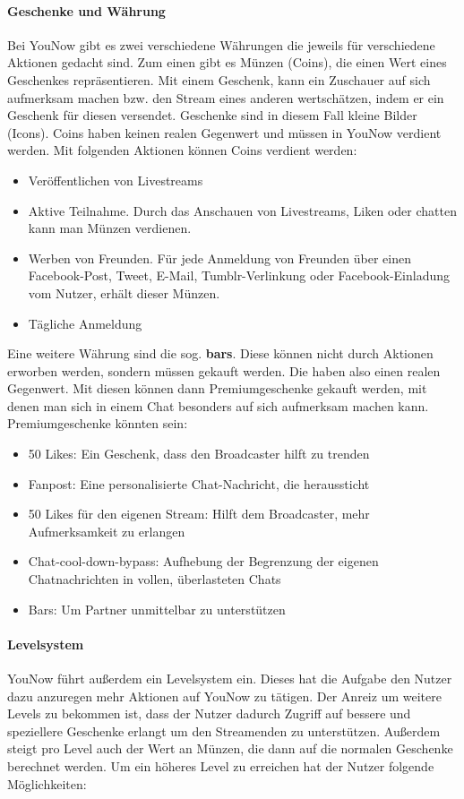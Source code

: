 \paragraph{Geschenke und Währung}
Bei YouNow gibt es zwei verschiedene Währungen die jeweils für verschiedene Aktionen gedacht sind. Zum einen gibt es Münzen (Coins), die einen Wert eines Geschenkes repräsentieren. Mit einem Geschenk, kann ein Zuschauer auf sich aufmerksam machen bzw. den Stream eines anderen wertschätzen, indem er ein Geschenk für diesen versendet. Geschenke sind in diesem Fall kleine Bilder (Icons).
Coins haben keinen realen Gegenwert und müssen in YouNow verdient werden. Mit folgenden Aktionen können Coins verdient werden:

\begin{itemize}
	\item Veröffentlichen von Livestreams
	\item Aktive Teilnahme. Durch das Anschauen von Livestreams, Liken oder chatten kann man Münzen verdienen.
	\item Werben von Freunden. Für jede
		Anmeldung von Freunden über einen Facebook-Post, Tweet, E-Mail,
		Tumblr-Verlinkung oder Facebook-Einladung vom Nutzer, erh\"alt dieser M\"unzen. 
	\item T\"agliche Anmeldung
\end{itemize} 

Eine weitere Währung sind die sog. \textbf{bars}. Diese können nicht durch Aktionen erworben werden, sondern müssen gekauft werden. Die haben also einen realen Gegenwert. Mit diesen können dann Premiumgeschenke gekauft werden, mit denen man sich in einem Chat besonders auf sich aufmerksam machen kann. Premiumgeschenke könnten sein:

\begin{itemize}
	\item 50 Likes: Ein Geschenk, dass den Broadcaster hilft zu trenden
	\item Fanpost: Eine personalisierte Chat-Nachricht, die heraussticht 
	\item 50 Likes für den eigenen Stream: Hilft dem Broadcaster, mehr Aufmerksamkeit zu erlangen
	\item Chat-cool-down-bypass: Aufhebung der Begrenzung der eigenen Chatnachrichten in vollen, überlasteten Chats
	\item Bars: Um Partner unmittelbar zu unterstützen
\end{itemize}

\paragraph{Levelsystem}
YouNow führt außerdem ein Levelsystem ein. Dieses hat die Aufgabe den Nutzer dazu anzuregen mehr Aktionen auf YouNow zu tätigen. Der Anreiz um weitere Levels zu bekommen ist, dass der Nutzer dadurch Zugriff auf bessere und speziellere Geschenke erlangt um den Streamenden zu unterstützen. Außerdem steigt pro Level auch der Wert an Münzen, die dann auf die normalen Geschenke berechnet werden. 
Um ein höheres Level zu erreichen hat der Nutzer folgende Möglichkeiten:

